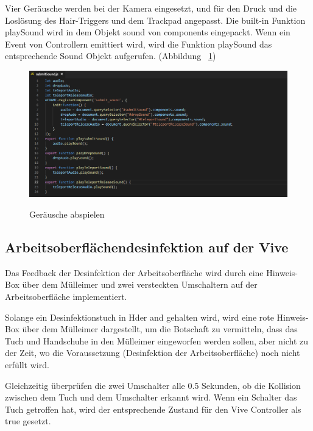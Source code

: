 Vier Geräusche werden bei der Kamera eingesetzt, und für den Druck und die Loslösung des Hair-Triggers und dem Trackpad angepasst. Die built-in Funktion {\selectfont playSound} wird in dem Objekt {\selectfont sound} von {\selectfont components} eingepackt. Wenn ein Event von Controllern emittiert wird, wird die Funktion {\selectfont playSound} das entsprechende Sound Objekt aufgerufen. (Abbildung ~\ref{fig:submitSound})
 
\begin{figure}[ht]
\vspace*{1em}
\centering
\caption[Geräusche abspielen]{Geräusche abspielen}
\includegraphics[width=\textwidth]{images/submitSound.png}
\label{fig:submitSound} 
\end{figure}
 
 \subsection{Arbeitsoberflächendesinfektion auf der Vive}
 Das Feedback der Desinfektion der Arbeitsoberfläche wird durch eine Hinweis-Box über dem Mülleimer und zwei versteckten Umschaltern auf der Arbeitsoberfläche implementiert.
 
 Solange ein Desinfektionstuch in Hder and gehalten wird, wird eine rote Hinweis-Box über dem Mülleimer dargestellt, um die Botschaft zu vermitteln, dass das Tuch und Handschuhe in den Mülleimer eingeworfen werden sollen, aber nicht zu der Zeit, wo die Voraussetzung (Desinfektion der Arbeitsoberfläche) noch nicht erfüllt wird.
 
 Gleichzeitig überprüfen die zwei Umschalter alle 0.5 Sekunden, ob die Kollision zwischen dem Tuch und dem Umschalter erkannt wird. Wenn ein Schalter das Tuch getroffen hat, wird der entsprechende Zustand für den Vive Controller als {\selectfont true} gesetzt.
 
